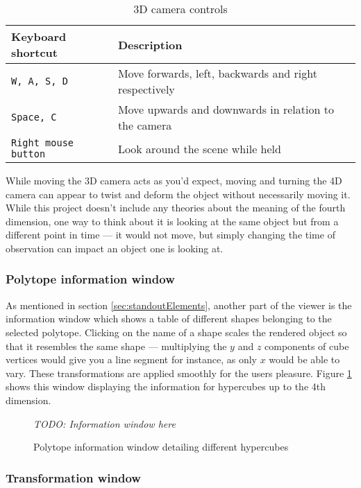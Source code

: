 \documentclass[11pt, a4paper]{article}
\begin{document}
\begin{table}[!h]
  \centering
  \begin{tabular}{ | l | p{9.5cm} |}
    \hline
    \textbf{Keyboard shortcut} & \textbf{Description} \\ \hline
    \texttt{W, A, S, D} & Move forwards, left, backwards and right respectively \\ \hline
    \texttt{Space, C} & Move upwards and downwards in relation to the camera \\ \hline
    \texttt{Right mouse button} & Look around the scene while held \\ \hline
  \end{tabular}
  \caption{3D camera controls}
  \label{table:cameraControls}
\end{table}

While moving the 3D camera acts as you'd expect, moving and turning the 4D camera can appear to twist and deform the object without necessarily moving it. While this project doesn't include any theories about the meaning of the fourth dimension, one way to think about it is looking at the same object but from a different point in time --- it would not move, but simply changing the time of observation can impact an object one is looking at.

\subsubsection{Polytope information window}

As mentioned in section \ref{sec:standoutElements}, another part of the viewer is the information window which shows a table of different shapes belonging to the selected polytope. Clicking on the name of a shape scales the rendered object so that it resembles the same shape --- multiplying the $y$ and $z$ components of cube vertices would give you a line segment for instance, as only $x$ would be able to vary. These transformations are applied smoothly for the users pleasure. Figure \ref{fig:informationWindow} shows this window displaying the information for hypercubes up to the 4th dimension.

\begin{figure}[!h]
  \centering
  \emph{TODO: Information window here}
  \caption{Polytope information window detailing different hypercubes}
  \label{fig:informationWindow}
\end{figure}

\subsubsection{Transformation window}
\label{subsubsec:transformationWindow}
\end{document}
